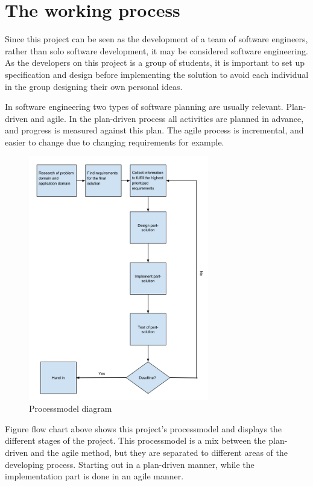 \chapter{The working process}
Since this project can be seen as the development of a team of software engineers, rather than solo software development, it may be considered software engineering. As the developers on this project is a group of students, it is important to set up specification and design before implementing the solution to avoid each individual in the group designing their own personal ideas.

In software engineering two types of software planning are usually relevant. Plan-driven and agile. In the plan-driven process all activities are planned in advance, and progress is measured against this plan. The agile process is incremental, and easier to change due to changing requirements for example.

\begin{figure}[h!]
\centering
\includegraphics[width=0.7\textwidth]{figures/ProcessmodelDiagram.png}
\caption{Processmodel diagram}
\label{fig:processmodelDiagram}
\end{figure}

Figure  flow chart above shows this project's processmodel and displays the different stages of the project. This processmodel is a mix between the plan-driven and the agile method, but they are separated to different areas of the developing process. Starting out in a plan-driven manner, while the implementation part is done in an agile manner.

